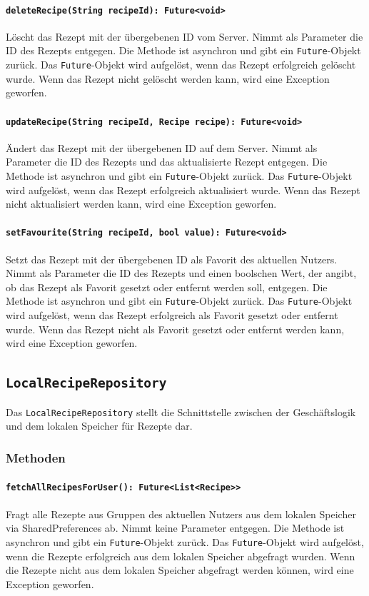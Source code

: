 \documentclass{entwurfsheft}
\begin{document}
\paragraph{\texttt{deleteRecipe(String recipeId): Future<void>}}
Löscht das Rezept mit der übergebenen ID vom Server. Nimmt als Parameter die ID des Rezepts entgegen. Die Methode ist asynchron und gibt ein \texttt{Future}-Objekt zurück. Das \texttt{Future}-Objekt wird aufgelöst, wenn das Rezept erfolgreich gelöscht wurde. Wenn das Rezept nicht gelöscht werden kann, wird eine Exception geworfen.
\paragraph{\texttt{updateRecipe(String recipeId, Recipe recipe): Future<void>}}
Ändert das Rezept mit der übergebenen ID auf dem Server. Nimmt als Parameter die ID des Rezepts und das aktualisierte Rezept entgegen. Die Methode ist asynchron und gibt ein \texttt{Future}-Objekt zurück. Das \texttt{Future}-Objekt wird aufgelöst, wenn das Rezept erfolgreich aktualisiert wurde. Wenn das Rezept nicht aktualisiert werden kann, wird eine Exception geworfen.
\paragraph{\texttt{setFavourite(String recipeId, bool value): Future<void>}}
Setzt das Rezept mit der übergebenen ID als Favorit des aktuellen Nutzers. Nimmt als Parameter die ID des Rezepts und einen boolschen Wert, der angibt, ob das Rezept als Favorit gesetzt oder entfernt werden soll, entgegen. Die Methode ist asynchron und gibt ein \texttt{Future}-Objekt zurück. Das \texttt{Future}-Objekt wird aufgelöst, wenn das Rezept erfolgreich als Favorit gesetzt oder entfernt wurde. Wenn das Rezept nicht als Favorit gesetzt oder entfernt werden kann, wird eine Exception geworfen.
\newpage
\subsection{\texttt{LocalRecipeRepository}}\label{sec:localreciperepository}
Das \texttt{LocalRecipeRepository} stellt die Schnittstelle zwischen der Geschäftslogik und dem lokalen Speicher für Rezepte dar.
\subsubsection*{Methoden}
\paragraph{\texttt{fetchAllRecipesForUser(): Future<List<Recipe>>}}
Fragt alle Rezepte aus Gruppen des aktuellen Nutzers aus dem lokalen Speicher via \Gls{SharedPreferences} ab. Nimmt keine Parameter entgegen. Die Methode ist asynchron und gibt ein \texttt{Future}-Objekt zurück. Das \texttt{Future}-Objekt wird aufgelöst, wenn die Rezepte erfolgreich aus dem lokalen Speicher abgefragt wurden. Wenn die Rezepte nicht aus dem lokalen Speicher abgefragt werden können, wird eine Exception geworfen.
\newpage
\end{document}
